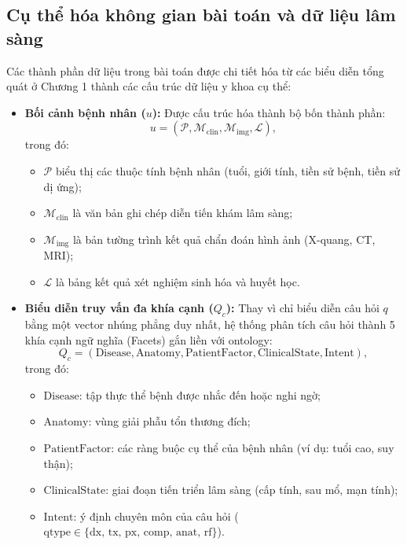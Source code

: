 \subsection{Cụ thể hóa không gian bài toán và dữ liệu lâm sàng}
Các thành phần dữ liệu trong bài toán được chi tiết hóa từ các biểu diễn tổng quát ở Chương 1 thành các cấu trúc dữ liệu y khoa cụ thể:
\begin{itemize}
    \item \textbf{Bối cảnh bệnh nhân ($u$):} Được cấu trúc hóa thành bộ bốn thành phần:
    \begin{equation}
        u = (\mathcal{P}, \mathcal{M}_{\mathrm{clin}}, \mathcal{M}_{\mathrm{img}}, \mathcal{L}),
    \end{equation}
    trong đó:
    \begin{itemize}
        \item $\mathcal{P}$ biểu thị các thuộc tính bệnh nhân (tuổi, giới tính, tiền sử bệnh, tiền sử dị ứng);
        \item $\mathcal{M}_{\mathrm{clin}}$ là văn bản ghi chép diễn tiến khám lâm sàng;
        \item $\mathcal{M}_{\mathrm{img}}$ là bản tường trình kết quả chẩn đoán hình ảnh (X-quang, CT, MRI);
        \item $\mathcal{L}$ là bảng kết quả xét nghiệm sinh hóa và huyết học.
    \end{itemize}

    \item \textbf{Biểu diễn truy vấn đa khía cạnh ($Q_c$):} Thay vì chỉ biểu diễn câu hỏi $q$ bằng một vector nhúng phẳng duy nhất, hệ thống phân tích câu hỏi thành 5 khía cạnh ngữ nghĩa (Facets) gắn liền với ontology:
    \begin{equation}
        Q_c = (\mathrm{Disease}, \mathrm{Anatomy}, \mathrm{PatientFactor}, \mathrm{ClinicalState}, \mathrm{Intent}),
    \end{equation}
    trong đó:
    \begin{itemize}
        \item $\mathrm{Disease}$: tập thực thể bệnh được nhắc đến hoặc nghi ngờ;
        \item $\mathrm{Anatomy}$: vùng giải phẫu tổn thương đích;
        \item $\mathrm{PatientFactor}$: các ràng buộc cụ thể của bệnh nhân (ví dụ: tuổi cao, suy thận);
        \item $\mathrm{ClinicalState}$: giai đoạn tiến triển lâm sàng (cấp tính, sau mổ, mạn tính);
        \item $\mathrm{Intent}$: ý định chuyên môn của câu hỏi ($\mathrm{qtype} \in \{\text{dx, tx, px, comp, anat, rf}\}$).
    \end{itemize}


\end{itemize}
